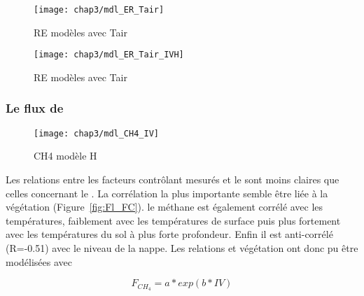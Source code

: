 \begin{figure}
\centering
\texttt{[image: chap3/mdl\_ER\_Tair]}
\caption{RE modèles avec Tair}
\label{fig:mdl_ER_Tair}
\end{figure}

\begin{figure}
\centering
\texttt{[image: chap3/mdl\_ER\_Tair\_IVH]}
\caption{RE modèles avec Tair}
\label{fig:ER_mdl_TairIVH}
\end{figure}

%
%
%
%

\subsubsection{Le flux de \chh}

\begin{figure}
\centering
\texttt{[image: chap3/mdl\_CH4\_IV]}
\caption{CH4 modèle H}
\label{fig:CH4_mdl}
\end{figure}

Les relations entre les facteurs contrôlant mesurés et le \chh sont moins claires que celles concernant le \coo.
La corrélation la plus importante semble être liée à la végétation (Figure~\ref{fig:Fl_FC}). 
le méthane est également corrélé avec les températures, faiblement avec les températures de surface puis plus fortement avec les températures du sol à plus forte profondeur.
Enfin il est anti-corrélé (R=-0.51) avec le niveau de la nappe.
Les relations \chh et végétation ont donc pu être modélisées avec 

\begin{equation} \label{eq:CH4_H}
F_{CH_{4}} = a*exp(b*IV)
\end{equation}


